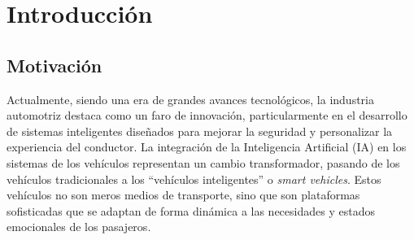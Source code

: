 \documentclass[12pt]{report} %
\begin{document}



\chapter{Introducción}

\section{Motivación}

Actualmente, siendo una era de grandes avances tecnológicos, la industria automotriz destaca como un faro de innovación, particularmente en el desarrollo de sistemas inteligentes diseñados para mejorar la seguridad y personalizar la experiencia del conductor. La integración de la Inteligencia Artificial (IA) en los sistemas de los vehículos representan un cambio transformador, pasando de los vehículos tradicionales a los “vehículos inteligentes” o \textit{smart vehicles}. Estos vehículos no son meros medios de transporte, sino que son plataformas sofisticadas que se adaptan de forma dinámica a las necesidades y estados emocionales de los pasajeros. 
\end{document}
